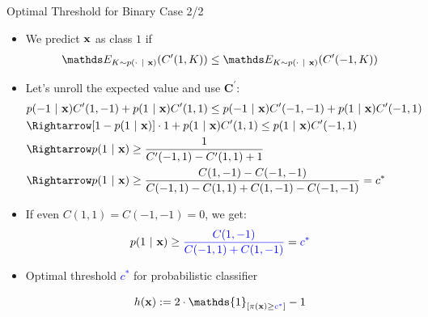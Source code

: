 \documentclass[11pt,compress,t,notes=noshow, xcolor=table]{beamer}
\begin{document}
\begin{frame}{Optimal Threshold for Binary Case 2/2}
            \begin{itemize}
            \item We predict $\mathbf{x}$ as class $1$ if 
            \begin{align*}
                \E_{K \sim p(\cdot ~|~ \xv)}( C^\prime(1,K) )  \leq \E_{K \sim p(\cdot ~|~ \xv)}( C^\prime(-1,K) ) \\
            \end{align*}

			\item Let's unroll the expected value and use $\mathbf{C}^\prime$:
            \footnotesize{
    			\begin{align*}	
                    & p(-1 ~|~ \xv ) C^\prime(1,-1)  + 	p(1 ~|~ \xv ) C^\prime(1,1) \leq  p(-1 ~|~ \xv ) C^\prime(-1,-1)  + 	p(1 ~|~ \xv ) C^\prime(-1,1)  \\ 
                    &\Rightarrow [1 - p(1 ~|~ \xv)] \cdot 1 + p(1 ~|~ \xv) C^\prime(1, 1) \leq p(1 ~|~ \xv) C^\prime(-1, 1) \\
                    &\Rightarrow p(1 ~|~ \xv) \geq \frac{1}{C^\prime(-1, 1) - C^\prime(1, 1) + 1} \\
                    &\Rightarrow p(1 ~|~ \xv) \geq \frac{C(1, -1) - C(-1, -1)}{C(-1, 1) - C(1, 1) + C(1, -1) - C(-1, -1)} = c^*
    			\end{align*}
            }
		
            \item If even $C(1, 1) = C(-1, -1) = 0 $, we get:
            \begin{align*}
                p(1 ~|~ \mathbf{x}) \geq \textcolor{blue}{\frac{C(1, -1)}{C(-1, 1) + C(1, -1)}} = \textcolor{blue}{c^{*}}
            \end{align*}

            \item Optimal threshold \textcolor{blue}{$c^*$} for probabilistic classifier

            $$   \hx := 2 \cdot \mathds{1}_{[ \pi(\xv) \geq \textcolor{blue}{c^*}]} -1 $$
							
		\end{itemize}
\end{frame}
\end{document}
